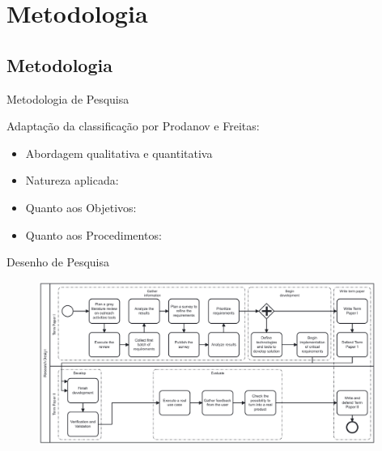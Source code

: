 \section{Metodologia}
\subsection*{Metodologia}

\begin{frame}{{\sffamily Metodologia de Pesquisa}}
  \begin{block}{}
    Adaptação da classificação por Prodanov e Freitas:
    \begin{itemize}
      \item Abordagem qualitativa e quantitativa %
      \item Natureza aplicada: %
      \item Quanto aos Objetivos: %
      \item Quanto aos Procedimentos: %

    \end{itemize}
  \end{block}
\end{frame}

\begin{frame}{{\sffamily Desenho de Pesquisa}}
  \begin{figure}
    \centering
    \includegraphics[width=11cm, ]{img/2-research design.pdf}
  \end{figure}
\end{frame}